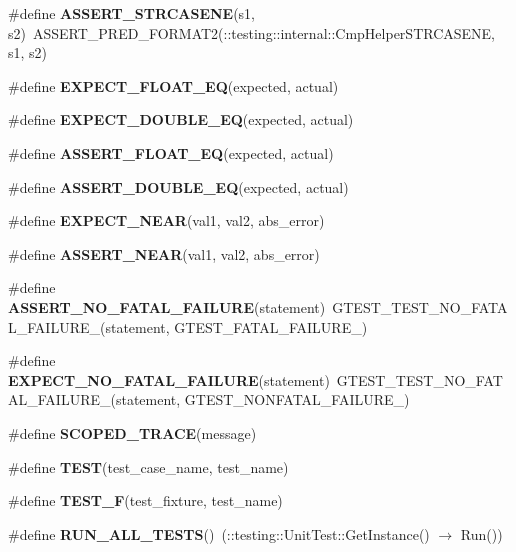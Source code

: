 \begin{CompactItemize}
\#define {\bf ASSERT\_\-STRCASENE}(s1, s2)~ASSERT\_\-PRED\_\-FORMAT2(::testing::internal::CmpHelperSTRCASENE, s1, s2)
\item 
\#define {\bf EXPECT\_\-FLOAT\_\-EQ}(expected, actual)
\item 
\#define {\bf EXPECT\_\-DOUBLE\_\-EQ}(expected, actual)
\item 
\#define {\bf ASSERT\_\-FLOAT\_\-EQ}(expected, actual)
\item 
\#define {\bf ASSERT\_\-DOUBLE\_\-EQ}(expected, actual)
\item 
\#define {\bf EXPECT\_\-NEAR}(val1, val2, abs\_\-error)
\item 
\#define {\bf ASSERT\_\-NEAR}(val1, val2, abs\_\-error)
\item 
\#define {\bf ASSERT\_\-NO\_\-FATAL\_\-FAILURE}(statement)~GTEST\_\-TEST\_\-NO\_\-FATAL\_\-FAILURE\_\-(statement, GTEST\_\-FATAL\_\-FAILURE\_\-)
\item 
\#define {\bf EXPECT\_\-NO\_\-FATAL\_\-FAILURE}(statement)~GTEST\_\-TEST\_\-NO\_\-FATAL\_\-FAILURE\_\-(statement, GTEST\_\-NONFATAL\_\-FAILURE\_\-)
\item 
\#define {\bf SCOPED\_\-TRACE}(message)
\item 
\#define {\bf TEST}(test\_\-case\_\-name, test\_\-name)
\item 
\#define {\bf TEST\_\-F}(test\_\-fixture, test\_\-name)
\item 
\#define {\bf RUN\_\-ALL\_\-TESTS}()~(::testing::UnitTest::GetInstance() $\rightarrow$ Run())
\end{CompactItemize}

